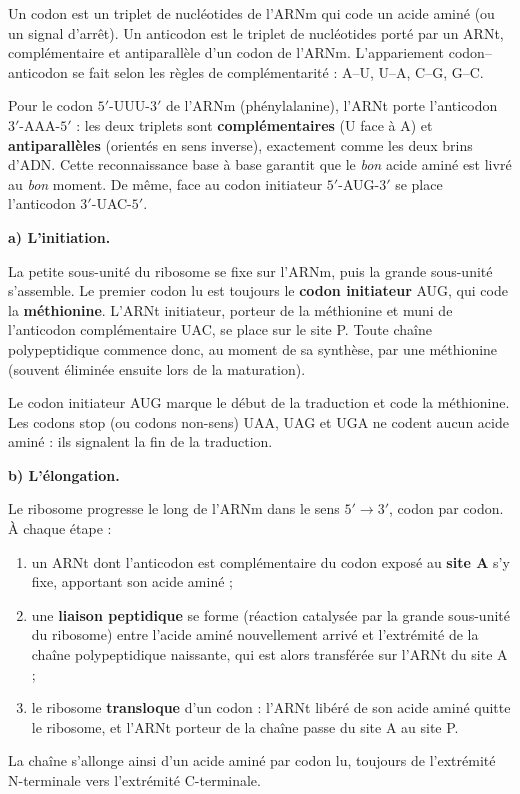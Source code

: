 \documentclass[11pt]{article}
\newcommand{\cle}[1]{{\popxbold\color{popdark}#1}}
\newcounter{popsec}
\newcounter{popsub}
\newcommand{\courssub}[1]{%
  \stepcounter{popsub}%
  \par\vspace{9pt}\noindent{\popxbold\fontsize{11.5}{13}\selectfont\color{popink}{\color{poporange}\thepopsec.\thepopsub}\hspace{6pt}#1}\par\nopagebreak\vspace{4pt}
}
\begin{document}
\begin{definition}
Un \cle{codon} est un triplet de nucléotides de l'ARNm qui code un acide aminé (ou un signal d'arrêt). Un \cle{anticodon} est le triplet de nucléotides porté par un ARNt, complémentaire et antiparallèle d'un codon de l'ARNm. L'appariement codon--anticodon se fait selon les règles de complémentarité : A--U, U--A, C--G, G--C.
\end{definition}

\begin{exemplebox}
Pour le codon $5'$-UUU-$3'$ de l'ARNm (phénylalanine), l'ARNt porte l'anticodon $3'$-AAA-$5'$ : les deux triplets sont \textbf{complémentaires} (U face à A) et \textbf{antiparallèles} (orientés en sens inverse), exactement comme les deux brins d'ADN. Cette reconnaissance base à base garantit que le \emph{bon} acide aminé est livré au \emph{bon} moment. De même, face au codon initiateur $5'$-AUG-$3'$ se place l'anticodon $3'$-UAC-$5'$.
\end{exemplebox}

\courssub{Les trois étapes de la traduction}

\textbf{a) L'initiation.}\par
La petite sous-unité du ribosome se fixe sur l'ARNm, puis la grande sous-unité s'assemble. Le premier codon lu est toujours le \textbf{codon initiateur} \cle{AUG}, qui code la \textbf{méthionine}. L'ARNt initiateur, porteur de la méthionine et muni de l'anticodon complémentaire UAC, se place sur le site P. Toute chaîne polypeptidique commence donc, au moment de sa synthèse, par une méthionine (souvent éliminée ensuite lors de la maturation).

\begin{definition}
Le \cle{codon initiateur} AUG marque le début de la traduction et code la méthionine. Les \cle{codons stop} (ou codons non-sens) UAA, UAG et UGA ne codent aucun acide aminé : ils signalent la fin de la traduction.
\end{definition}

\textbf{b) L'élongation.}\par
Le ribosome progresse le long de l'ARNm dans le sens $5' \rightarrow 3'$, codon par codon. À chaque étape :
\begin{enumerate}
\item un ARNt dont l'anticodon est complémentaire du codon exposé au \textbf{site A} s'y fixe, apportant son acide aminé ;
\item une \textbf{liaison peptidique} se forme (réaction catalysée par la grande sous-unité du ribosome) entre l'acide aminé nouvellement arrivé et l'extrémité de la chaîne polypeptidique naissante, qui est alors transférée sur l'ARNt du site A ;
\item le ribosome \textbf{transloque} d'un codon : l'ARNt libéré de son acide aminé quitte le ribosome, et l'ARNt porteur de la chaîne passe du site A au site P.
\end{enumerate}
La chaîne s'allonge ainsi d'un acide aminé par codon lu, toujours de l'extrémité N-terminale vers l'extrémité C-terminale.
\end{document}
